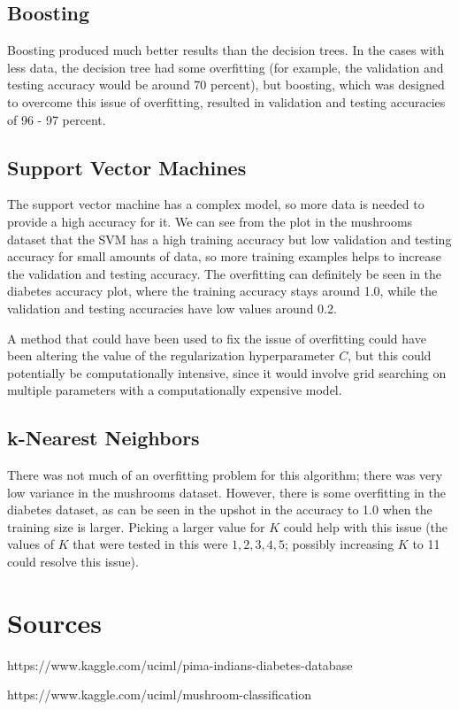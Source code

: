 \documentclass[11pt]{article}
\begin{document}
        \subsection{Boosting}

        Boosting produced much better results than the decision trees. In the cases with less data, the decision
        tree had some overfitting (for example, the validation and testing accuracy would be around 70 percent),
        but boosting, which was designed to overcome this issue of overfitting, resulted in validation
        and testing accuracies of 96 - 97 percent.

        \subsection{Support Vector Machines}

        The support vector machine has a complex model, so more data is needed to provide a high accuracy for it. We can see from the plot in the mushrooms dataset
        that the SVM has a high training accuracy but low validation and testing accuracy for small amounts of data, so more training examples helps to increase the
        validation and testing accuracy. The overfitting can definitely be
        seen in the diabetes accuracy plot, where the training accuracy
        stays around 1.0, while the validation and testing accuracies have low values around 0.2.
        
        A method that could have been used to
        fix the issue of overfitting could have been altering the value of the regularization hyperparameter $C$,
        but this could potentially be computationally intensive, since it would involve grid
        searching on multiple parameters with a computationally expensive model.

        \subsection{k-Nearest Neighbors}

        There was not much of an overfitting problem for this algorithm; there was
        very low variance in the mushrooms dataset. However, there is some overfitting
        in the diabetes dataset, as can be seen in the upshot in the accuracy to 1.0 when the training
        size is larger. Picking a larger value for $K$ could help with this issue (the
        values of $K$ that were tested in this were $1, 2, 3, 4, 5$; possibly increasing
        $K$ to 11 could resolve this issue).

        \section{Sources}

        https://www.kaggle.com/uciml/pima-indians-diabetes-database

        https://www.kaggle.com/uciml/mushroom-classification

    
\end{document}
